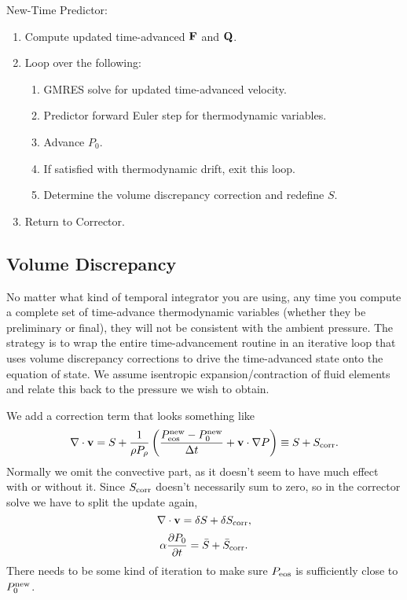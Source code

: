 \documentclass[final]{siamltex}
\def\Fb {{\bf F}}
\def\Qb {{\bf Q}}
\def\vb {{\bf v}}
\begin{document}
New-Time Predictor:\\
\begin{enumerate}
\item Compute updated time-advanced $\Fb$ and $\Qb$.
\item Loop over the following:
\begin{enumerate}
\item GMRES solve for updated time-advanced velocity.
\item Predictor forward Euler step for thermodynamic variables.
\item Advance $P_0$.
\item If satisfied with thermodynamic drift, exit this loop.
\item Determine the volume discrepancy correction and redefine $S$.
\end{enumerate}
\item Return to Corrector.
\end{enumerate}

\subsection{Volume Discrepancy}
No matter what kind of temporal integrator you are using, any time you compute a
complete set of time-advance thermodynamic variables (whether they be preliminary
or final), they will not be consistent with the ambient pressure.  The strategy
is to wrap the entire time-advancement routine in an iterative loop that uses
volume discrepancy corrections to drive the time-advanced state onto the
equation of state.  We assume isentropic expansion/contraction of fluid elements
and relate this back to the pressure we wish to obtain.

We add a correction term that looks something like
\begin{equation}
\nabla\cdot\vb = S + \frac{1}{\rho P_\rho}\left(\frac{P_{\rm eos}^{\rm new} - P_0^{\rm new}}{\Delta t} + \vb\cdot\nabla P\right) \equiv S + S_{\rm corr}.
\end{equation}
Normally we omit the convective part, as it doesn't seem to have much effect with or
without it.  Since $S_{\rm corr}$ doesn't necessarily sum to zero, so in the 
corrector solve we have to split the update again,
\begin{equation}
\nabla\cdot\vb = \delta S + \delta S_{\rm corr},
\end{equation}
\begin{equation}
\alpha\frac{\partial P_0}{\partial t} = \bar{S} + \bar{S}_{\rm corr}.
\end{equation}
There needs to be some kind of iteration to make sure $P_{\rm eos}$ is sufficiently
close to $P_0^{\rm new}$.
\end{document}
